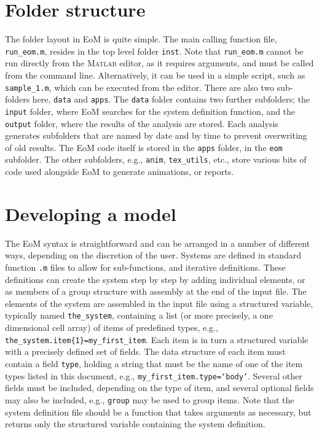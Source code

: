 \section{Folder structure}
The folder layout in EoM is quite simple.  The main calling function file, \texttt{run\_eom.m}, resides in the top level folder \texttt{inst}.  Note that \texttt{run\_eom.m} cannot be run directly from the M{\scshape atlab}\textsuperscript{\textregistered} editor, as it requires arguments, and must be called from the command line.  Alternatively, it can be used in a simple script, such as \texttt{sample\_1.m}, which can be executed from the editor.  There are also two sub-folders here, \texttt{data} and \texttt{apps}.  The \texttt{data} folder contains two further subfolders; the \texttt{input} folder, where EoM searches for the system definition function, and the \texttt{output} folder, where the results of the analysis are stored.  Each analysis generates subfolders that are named by date and by time to prevent overwriting of old results.  The EoM code itself is stored in  the \texttt{apps} folder, in the \texttt{eom} subfolder.  The other subfolders, e.g., \texttt{anim}, \texttt{tex\_utils}, etc., store various bits of code used alongside EoM to generate animations, or reports.

\section{Developing a model}
The EoM syntax is straightforward and can be arranged in a number of different ways, depending on the discretion of the user.  Systems are defined in standard function \texttt{.m} files to allow for sub-functions, and iterative definitions.  These definitions can create the system step by step by adding individual elements, or as members of a group structure with assembly at the end of the input file.  The elements of the system are assembled in the input file using a structured variable, typically named \texttt{the\_system}, containing a list (or more precisely, a one dimensional cell array) of items of predefined types, e.g., \texttt{the\_system.item\{1\}=my\_first\_item}.  Each item is in turn a structured variable with a precisely defined set of fields.  The data structure of each item must contain a field \texttt{type}, holding a string that must be the name of one of the item types listed in this document, e.g., \texttt{my\_first\_item.type=`body'}.  Several other fields must be included, depending on the type of item, and several optional fields may also be included, e.g., \texttt{group} may be used to group items.  Note that the system definition file should be a function that takes arguments as necessary, but returns only the structured variable containing the system definition.

